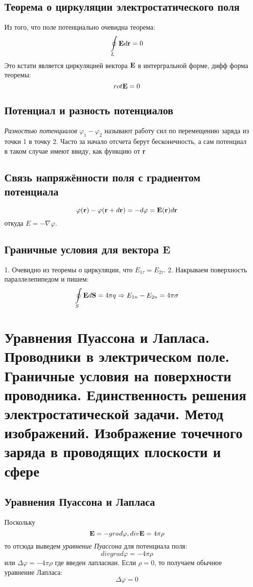\documentclass[a4paper,12pt]{article} %
\begin{document}
\subsection {Теорема о циркуляции электростатического поля}
Из того, что поле потенциально очевидна теорема:
\begin{equation}
	\oint\limits_L {\bf E} d {\bf r} = 0
\end{equation}
Это кстати является циркуляцией вектора $\bf E$ в интергральной форме, дифф форма теоремы:
\begin{equation}
	rot {\bf E} = 0
\end{equation}
\subsection{Потенциал и разность потенциалов}
{\it Разностью потенциалов} $\varphi_1 - \varphi_2$ называют работу сил по перемещению заряда из точки 1 в точку 2. Часто за начало отсчета берут бесконечность, а сам потенциал в таком случае имеют ввиду, как функцию от {\bf r}
\subsection{Связь напряжённости поля с градиентом потенциала}
\begin{equation}
	\varphi ({\bf r}) - \varphi ({\bf r} + d  {\bf r}) = - d \varphi = {\bf E(r)} d {\bf r}
\end{equation}
откуда $E = - \nabla \varphi$.
\subsection{Граничные условия для вектора {\bf E}}
1. Очевидно из теоремы о циркуляции, что $E_{1\tau} = E_{2 \tau}$.
2. Накрываем поверхность параллелепипедом и пишем:
\begin{equation}
	\oint\limits_S {\bf E} d {\bf S} = 4 \pi q \Rightarrow E_{1n} - E_{2n} = 4 \pi \sigma
\end{equation}
\section{Уравнения Пуассона и Лапласа. Проводники в электрическом поле. Граничные условия на поверхности проводника. Единственность решения электростатической задачи. Метод изображений. Изображение точечного заряда в проводящих плоскости и сфере}
\subsection{Уравнения Пуассона и Лапласа}
Поскольку 
\begin{equation}
	{\bf E} = - grad \varphi, div {\bf E} = 4 \pi \rho
\end{equation}
то отсюда выведем {\it уравнение Пуассона} для потенциала поля:
\begin{equation}
	div grad \varphi = - 4 \pi \rho 
\end{equation}
или $ \Delta \varphi = - 4 \pi \rho$
где введен лапласиан. Если $\rho = 0$, то получаем обычное уравнение Лапласа:
\begin{equation}
	\Delta \varphi = 0
\end{equation}
\end{document}
